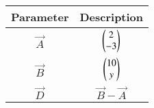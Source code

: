 \begin{tabular}[12pt]{ |c| c|}
    \hline
    \textbf{Parameter} & \textbf{Description}\\ 
    \hline
    $\vec{A}$ & $\begin{pmatrix}2\\-3\end{pmatrix}$ \\
    \hline 
    $\vec{B}$ & $\begin{pmatrix}10\\y\end{pmatrix}$ \\
	\hline
    $\vec{D}$ & $\vec{B}-\vec{A}$\\
    \hline 
    \end{tabular}

